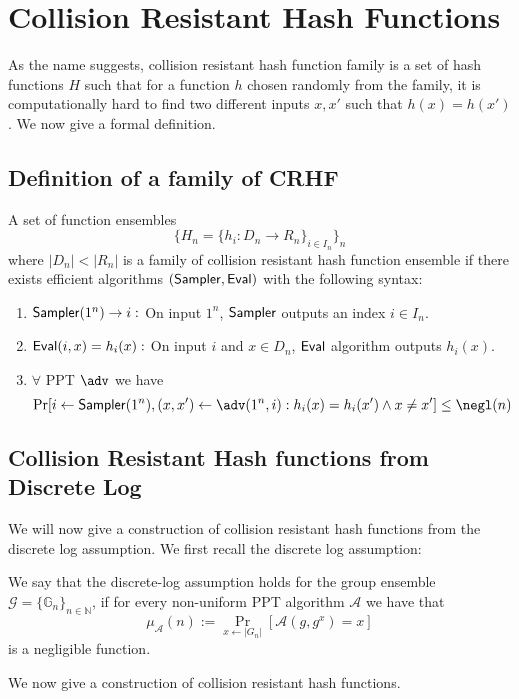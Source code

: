 \section{Collision Resistant Hash Functions}

As the name suggests, collision resistant hash function family is a set of hash functions $H$ such that for a function $h$ chosen randomly from the family, it is computationally hard to find two different inputs $x,x'$ such that $h(x) = h(x')$. We now give a formal definition.

\subsection{Definition of a family of CRHF}

A set of function ensembles
\[ \{H_n = \{h_i : D_n \to R_n \}_{i \in I_n} \}_n\]
where $|D_n| < |R_n|$ is a family of collision resistant hash function ensemble if there exists efficient algorithms $(\mathsf{Sampler},\mathsf{Eval})$ with the following syntax:
\begin{enumerate}
\item $\mathsf{Sampler}(1^n) \to i:$ On input $1^n$, $\mathsf{Sampler}$ outputs an index $i \in I_n$.
\item $\mathsf{Eval}(i,x) = h_i(x):$ On input $i$ and $x \in D_n$, $\mathsf{Eval}$ algorithm outputs $h_i(x)$. 
\item $\forall$ PPT $\adv$ we have
\[\Pr[i \gets \Sampler(1^n), (x,x') \gets \adv(1^n,i) : h_i(x) = h_i(x') \wedge x \neq x'] \leq \negl(n)\]
\end{enumerate}


\subsection{Collision Resistant Hash functions from Discrete Log}
We will now give a construction of collision resistant hash functions from the discrete log assumption. We first recall the discrete log assumption:
\begin{definition}
We say that the discrete-log assumption holds for the group ensemble $\mathcal{G} =\{ \mathbb{G}_n\}_{n \in \mathbb{N}}$, if for every non-uniform PPT algorithm $\mathcal{A}$ we have that
\[\mu_\mathcal{A}(n) := \Pr_{x \leftarrow |G_n|}[\mathcal{A}(g,g^x) = x]\]
is a negligible function.
\end{definition}

We now give a construction of collision resistant hash functions.  

